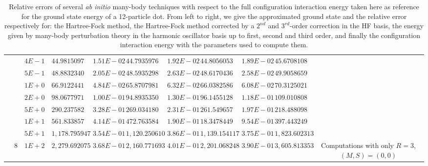 \begin{landscape}
\begin{table}[ht]
{\begin{tabular}[c]{c|c|c|c|c|c|c|c|c|c|c}
& &$4E-1$ & $44.981509722895$ & $1.51E-02$ & $44.793597600008$ & $1.92E-02$ & $44.805605335578$ & $1.89E-02$ & $45.670810879121$ &  \\
& &$5E-1$ & $48.883234063775$ & $2.05E-02$ & $48.593529883188$ & $2.63E-02$ & $48.617043675475$ & $2.58E-02$ & $49.905865978617$ &  \\
& &$1E+0$ & $66.912244170015$ & $4.84E-02$ & $65.870798169807$ & $6.32E-02$ & $66.038258669640$ & $6.08E-02$ & $70.312502175757$ &  \\
& &$2E+0$ & $98.067797155616$ & $1.00E-01$ & $94.893535047153$ & $1.30E-01$ & $96.145512858464$ & $1.18E-01$ & $109.010808418516$ &  \\
& &$5E+0$ & $290.237582802627$ & $3.28E-01$ & $269.034180902363$ & $2.31E-01$ & $261.549657366640$ & $1.97E-01$ & $218.488098056035$ &  \\
& &$1E+1$ & $561.833857484633$ & $4.14E-01$ & $472.763584640851$ & $1.90E-01$ & $18.347844959507$ & $9.54E-01$ & $397.443249829703$ &  \\
& &$5E+1$ & $1,178.795947280830$ & $3.54E-01$ & $1,120.250610293640$ & $3.86E-01$ & $1,139.154117277190$ & $3.75E-01$ & $1,823.602313382110$ &  \\
& \multirow{-23}{*}{8} &$1E+2$ & $2,279.692075613080$ & $3.68E-01$ & $2,160.771693088170$ & $4.01E-01$ & $2,201.068248999480$ & $3.90E-01$ & $3,605.813353473020$ & \multirow{-23}{3cm}{Computations with only $R=3$, $(M,S)=(0,0)$}  \\ 
\toprule[1pt]
\end{tabular}
}
 \caption{Relative errors of several \textit{ab initio} many-body techniques with respect to the full configuration interaction energy taken here as reference for the ground state energy of a 12-particle dot. From left to right, we give the approximated ground state and the relative error respectively for: the Hartree-Fock method, the Hartree-Fock method corrected by a $2^{nd}$ and $3^{rd}$-order correction in the HF basis, the energy given by many-body perturbation theory in the harmonic oscillator basis up to first, second and third order, and finally the configuration interaction energy with the parameters used to compute them.}
\label{tab:comparisonMethods12eHF} 
\end{table} 
\end{landscape}


